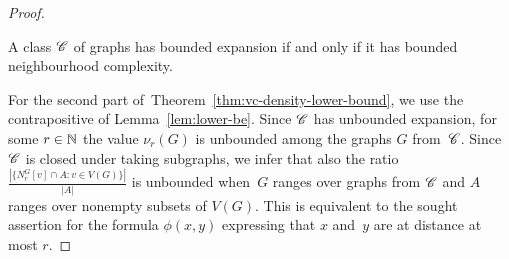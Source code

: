 \begin{proof}
\begin{lemma}\label{lem:lower-be}
  A class $\mathscr{C}$ of graphs has bounded expansion if and only if it has
  bounded neighbourhood complexity.
\end{lemma}

For the second part of~Theorem~\ref{thm:vc-density-lower-bound}, we
use the contrapositive of Lemma~\ref{lem:lower-be}. Since $\mathscr{C}$ has
unbounded expansion, for some $r\in \mathbb{N}$ the value $\nu_r(G)$ is
unbounded among the graphs $G$ from~$\mathscr{C}$.  Since $\mathscr{C}$ is closed
under taking subgraphs, we infer that also the ratio
$\frac{|\{N_r^G[v]\cap A \colon v\in V(G)\}|}{|A|}$ is unbounded
when~$G$ ranges over graphs from $\mathscr{C}$ and $A$ ranges over nonempty
subsets of $V(G)$.  This is equivalent to the sought assertion for the
formula $\phi(x,y)$ expressing that $x$ and~$y$ are at distance at
most $r$.
\end{proof}

